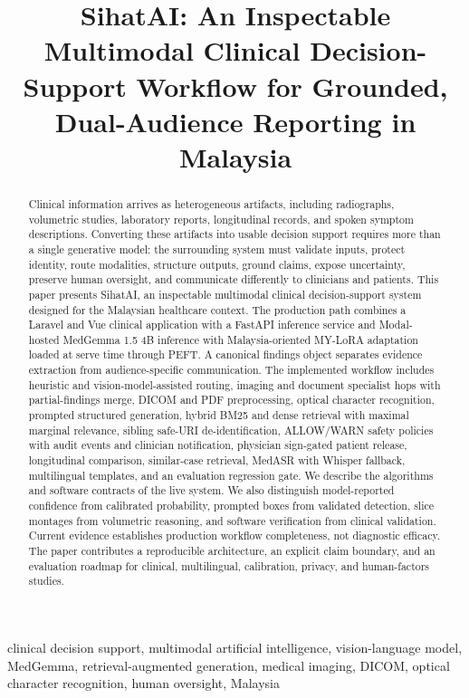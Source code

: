 \documentclass[conference]{IEEEtran}
\title{SihatAI: An Inspectable Multimodal Clinical Decision-Support Workflow for Grounded, Dual-Audience Reporting in Malaysia}
\author{
\IEEEauthorblockN{S. H. Liem\textsuperscript{*} and W. L. Kher}
\IEEEauthorblockA{\textit{Veximus Technologies}\\
Selangor, Malaysia\\
\textsuperscript{*}Corresponding author: thomasliem@veximus.com.my}
}
\begin{document}
\maketitle

\begin{abstract}
Clinical information arrives as heterogeneous artifacts, including radiographs, volumetric studies, laboratory reports, longitudinal records, and spoken symptom descriptions. Converting these artifacts into usable decision support requires more than a single generative model: the surrounding system must validate inputs, protect identity, route modalities, structure outputs, ground claims, expose uncertainty, preserve human oversight, and communicate differently to clinicians and patients. This paper presents SihatAI, an inspectable multimodal clinical decision-support system designed for the Malaysian healthcare context. The production path combines a Laravel and Vue clinical application with a FastAPI inference service and Modal-hosted MedGemma 1.5 4B inference with Malaysia-oriented MY-LoRA adaptation loaded at serve time through PEFT. A canonical findings object separates evidence extraction from audience-specific communication. The implemented workflow includes heuristic and vision-model-assisted routing, imaging and document specialist hops with partial-findings merge, DICOM and PDF preprocessing, optical character recognition, prompted structured generation, hybrid BM25 and dense retrieval with maximal marginal relevance, sibling safe-URI de-identification, ALLOW/WARN safety policies with audit events and clinician notification, physician sign-gated patient release, longitudinal comparison, similar-case retrieval, MedASR with Whisper fallback, multilingual templates, and an evaluation regression gate. We describe the algorithms and software contracts of the live system. We also distinguish model-reported confidence from calibrated probability, prompted boxes from validated detection, slice montages from volumetric reasoning, and software verification from clinical validation. Current evidence establishes production workflow completeness, not diagnostic efficacy. The paper contributes a reproducible architecture, an explicit claim boundary, and an evaluation roadmap for clinical, multilingual, calibration, privacy, and human-factors studies.
\end{abstract}

\begin{IEEEkeywords}
clinical decision support, multimodal artificial intelligence, vision-language model, MedGemma, retrieval-augmented generation, medical imaging, DICOM, optical character recognition, human oversight, Malaysia
\end{IEEEkeywords}
\end{document}

